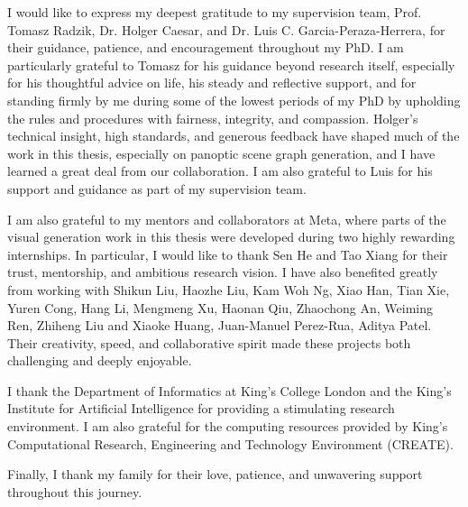 
\begin{acknowledgements}      

I would like to express my deepest gratitude to my supervision team, Prof. Tomasz Radzik, Dr. Holger Caesar, and Dr. Luis C. Garcia-Peraza-Herrera, for their guidance, patience, and encouragement throughout my PhD. I am particularly grateful to Tomasz for his guidance beyond research itself, especially for his thoughtful advice on life, his steady and reflective support, and for standing firmly by me during some of the lowest periods of my PhD by upholding the rules and procedures with fairness, integrity, and compassion. Holger's technical insight, high standards, and generous feedback have shaped much of the work in this thesis, especially on panoptic scene graph generation, and I have learned a great deal from our collaboration. I am also grateful to Luis for his support and guidance as part of my supervision team.

I am also grateful to my mentors and collaborators at Meta, where parts of the visual generation work in this thesis were developed during two highly rewarding internships. In particular, I would like to thank Sen He and Tao Xiang for their trust, mentorship, and ambitious research vision. I have also benefited greatly from working with Shikun Liu, Haozhe Liu, Kam Woh Ng, Xiao Han, Tian Xie, Yuren Cong, Hang Li, Mengmeng Xu, Haonan Qiu, Zhaochong An, Weiming Ren, Zhiheng Liu and Xiaoke Huang, Juan-Manuel Perez-Rua, Aditya Patel. Their creativity, speed, and collaborative spirit made these projects both challenging and deeply enjoyable.

I thank the Department of Informatics at King's College London and the King's Institute for Artificial Intelligence for providing a stimulating research environment. I am also grateful for the computing resources provided by King's Computational Research, Engineering and Technology Environment (CREATE).

Finally, I thank my family for their love, patience, and unwavering support throughout this journey.


\end{acknowledgements}
